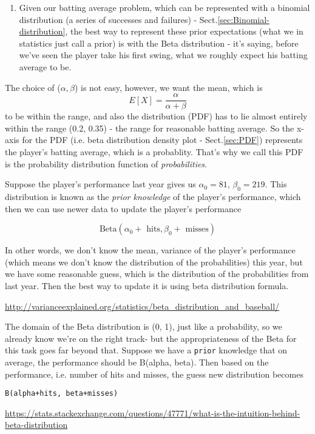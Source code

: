 \begin{mdframed}
\begin{enumerate}
  \item  Given our batting average problem, which can be represented with a
  binomial distribution (a series of successes and failures) -
  Sect.\ref{sec:Binomial-distribution}, the best way to represent
these prior expectations (what we in statistics just call a prior) is with the
Beta distribution - it's saying, before we've seen the player take his first
swing, what we roughly expect his batting average to be.
  
   
\end{enumerate}

The choice of ($\alpha, \beta$) is not easy, however, we want the mean, which is
\begin{equation}
E[X] = \frac{\alpha}{\alpha + \beta}
\end{equation}
to be within the range, and also the distribution (PDF) has to lie almost
entirely within the range (0.2, 0.35) - the range for reasonable batting
average. So the x-axis for the PDF (i.e. beta distribution density plot - Sect.\ref{sec:PDF})
represents the player's batting average, which is a probablity. That's why we
call this PDF is the probability distribution function of {\it probabilities}.

Suppose the player's performance last year gives us $\alpha_0 = 81$,
$\beta_0=219$.
This distribution is known as the {\it prior knowledge} of the player's
performance, which then we can use newer data to update the player's performance

\begin{equation}
\text{Beta}(\alpha_0 + \text{ hits}, \beta_0 + \text{ misses} )
\end{equation}

In other words, we don't know the mean, variance of the player's performance
(which means we don't know the distribution of the probabilities) this year, but we have some reasonable guess, which is
the distribution of the probabilities from last year. Then the best way to update it is using beta distribution formula.


\url{http://varianceexplained.org/statistics/beta_distribution_and_baseball/}

The domain of the Beta distribution is (0, 1), just like a probability, so we
already know we're on the right track- but the appropriateness of the Beta for
this task goes far beyond that. Suppose we have a \verb!prior! knowledge that on
average, the performance should be B(alpha, beta). Then based on the
performance, i.e.
number of hits and misses, the guess new distribution becomes
\begin{verbatim}
B(alpha+hits, beta+misses)
\end{verbatim}
\url{https://stats.stackexchange.com/questions/47771/what-is-the-intuition-behind-beta-distribution}

\end{mdframed}


